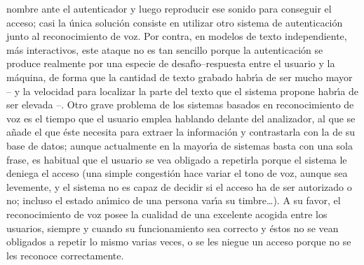 nombre ante el autenticador y luego reproducir ese sonido para conseguir el 
acceso; casi la \'unica soluci\'on consiste en utilizar otro sistema de 
autenticaci\'on junto al reconocimiento de voz. Por contra, en modelos de
texto independiente, m\'as interactivos, este ataque no es tan
sencillo porque la autenticaci\'on se produce realmente por una especie de 
desaf\'{\i}o--respuesta entre el usuario y la m\'aquina, de forma que la 
cantidad de texto grabado habr\'{\i}a de ser mucho mayor -- y la velocidad para
localizar la parte del texto que el sistema propone habr\'{\i}a de ser
elevada --. Otro grave problema de los sistemas basados en reconocimiento de
voz es el tiempo que el usuario 
emplea hablando delante del analizador, al que se a\~nade el que \'este necesita
para extraer la informaci\'on y contrastarla con la de su base de datos; aunque
actualmente en la mayor\'{\i}a de sistemas basta con una sola frase, es 
habitual que el usuario se vea obligado a repetirla porque el sistema le deniega
el acceso (una simple congesti\'on hace variar el tono de voz, aunque sea 
levemente, y el sistema no es capaz de decidir si el acceso ha de ser autorizado
o no; incluso el estado an\'{\i}mico de una persona var\'{\i}a su timbre\ldots).
A su favor, el reconocimiento de voz posee la cualidad de una excelente acogida
entre los usuarios, siempre y cuando su funcionamiento sea correcto y \'estos
no se vean obligados a repetir lo mismo varias veces, o se les niegue un acceso
porque no se les reconoce correctamente.

